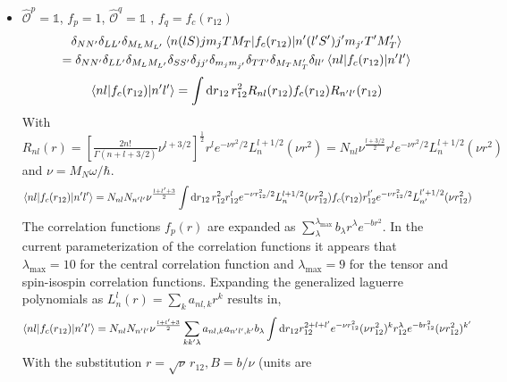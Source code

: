 \documentclass[10pt]{article}
\begin{document}
\begin{itemize}
	\item $\hat{\mathcal{O}}^{p} = \mathbb{1}$, $f_{p} = 1$, 
$\hat{\mathcal{O}}^{q} = \mathbb{1}$ , $f_{q} = f_c(r_{12})$ 
	\begin{multline*}
		\delta_{NN'} \delta_{LL'} \delta_{M_L M_{L'}} \braket{ n (l S) 
j m_j T M_T |  f_{c}(r_{12}) | n' (l' S') j' m_{j'} T' M_T'}  \\
		= \delta_{NN'} \delta_{LL'} \delta_{M_L M_{L'}} \delta_{SS'} 
\delta_{jj'} \delta_{m_j m_{j'}} \delta_{TT'} \delta_{M_T M_T'} \delta_{l l'} 
\braket{ n l |  f_{c}(r_{12}) | n' l'} 
	\end{multline*}
	\begin{multline*}
		\braket{ n l |  f_{c}(r_{12}) | n' l'} = \int \text{d} r_{12} 
\, r_{12}^{2} R_{nl}(r_{12}) f_{c}(r_{12}) R_{n'l'}(r_{12}) \\
	\end{multline*}
	With  $R_{nl}(r) = \left[ \frac{2n!}{\Gamma(n + l + 3/2)} \nu^{l + 3/2} 
\right]^{\frac{1}{2}} r^{l} e^{-\nu r^{2} /2} L_{n}^{l+1/2}(\nu r^{2}) = N_{nl} 
\nu^{\frac{l + 3/2}{2}} r^{l} e^{-\nu r^{2} /2} L_{n}^{l+1/2}(\nu r^{2})$ and $ 
\nu = M_N \omega / \hbar $.
	\begin{multline*}
		\braket{ n l |  f_{c}(r_{12}) | n' l'} = N_{nl} N_{n'l'} 
\nu^{\frac{l + l' + 3}{2}} \int \text{d} r_{12} \, r_{12}^{2} r_{12}^{l} 
e^{-\nu r_{12}^{2} /2} L_{n}^{l+1/2}(\nu r_{12}^{2}) f_{c}(r_{12}) r_{12}^{l'} 
e^{-\nu r_{12}^{2} /2} L_{n'}^{l'+1/2}(\nu r_{12}^{2}) \\
	\end{multline*}
	The correlation functions $f_{p}(r)$ are expanded as $ 
\sum_{\lambda}^{\lambda_{\text{max}}} b_{\lambda} r^{\lambda} e^{-b r^{2}}$.
	In the current parameterization of the correlation functions it appears 
that $\lambda_{\text{max}} = 10$ for the central correlation function and 
$\lambda_{\text{max}}=9$ for the tensor and spin-isospin correlation functions.
	Expanding the generalized laguerre polynomials as $ L_{n}^{l}(r) = 
\sum_{k} a_{nl,k} r^{k}$ results in,
	\begin{multline*}
		\braket{ n l |  f_{c}(r_{12}) | n' l'} = N_{nl} N_{n'l'} 
\nu^{\frac{l + l' + 3}{2}} \sum_{kk'\lambda} a_{nl,k} a_{n'l',k'} b_{\lambda}  
\int \text{d} r_{12} r_{12}^{2+l+l'} e^{-\nu r_{12}^{2}} ( \nu r_{12}^{2} )^{k} 
r_{12}^{\lambda} e^{-b r_{12}^{2}} ( \nu r_{12}^{2})^{k'}
	\end{multline*}
	With the substitution $r = \sqrt{\nu} \, r_{12}, B = b/\nu$ (units are 

\end{itemize}
\end{document}
